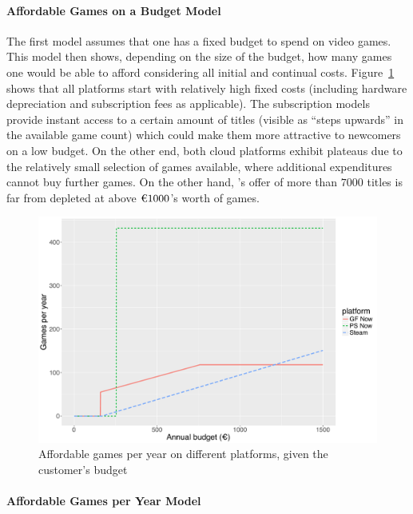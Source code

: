 \paragraph{Affordable Games on a Budget Model}

The first model assumes that one has a fixed budget to spend on video
games. This model then shows, depending on the size of the budget, how
many games one would be able to afford considering all initial and
continual costs. Figure~\ref{fig:gamesperyear-over-budget} shows that
all platforms start with relatively high fixed costs (including hardware
depreciation and subscription fees as applicable). The subscription
models provide instant access to a certain amount of titles (visible as
``steps upwards'' in the available game count) which could make them
more attractive to newcomers on a low budget. On the other end, both cloud
platforms exhibit plateaus due to the relatively small selection of
games available, where additional expenditures cannot buy further
games. On the other hand, \steam's offer of more than $7000$
titles is far from depleted at above $\text{\texteuro} 1000$'s worth of
games.


\begin{figure}[!t]
	\centering
	\includegraphics[width=1.0\columnwidth]{images/gamesperyear-over-budget.pdf}
	\caption{Affordable games per year on different platforms, given the customer's budget}
\label{fig:gamesperyear-over-budget}
\end{figure}


\paragraph{Affordable Games per Year Model}

